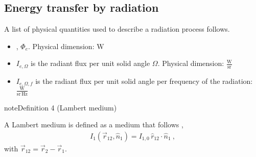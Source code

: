 \documentclass[letterpaper,10pt,english]{jupyterBook}
\begin{document}
\subsection{Energy transfer by radiation}
\label{\detokenize{ch/heat-transfer-radiation:energy-transfer-by-radiation}}
\sphinxAtStartPar
A list of physical quantities used to describe a radiation process follows.
\begin{itemize}
\item {} 
\sphinxAtStartPar
{}, \(\Phi_e\). Physical dimension: \(\text{W}\)

\item {} 
\sphinxAtStartPar
{} \(I_{e, \Omega}\) is the radiant flux per unit solid angle \(\Omega\). Physical dimension: \(\frac{\text{W}}{\text{sr}}\)

\item {} 
\sphinxAtStartPar
{} \(I_{e, \Omega, f}\) is the radiant flux per unit solid angle per frequency of the radiation: \(\frac{\text{W}}{\text{sr} \, \text{Hz}}\)

\end{itemize}
\label{ch/heat-transfer-radiation:definition-0}
\begin{sphinxadmonition}{note}{Definition 4 (Lambert medium)}



\sphinxAtStartPar
A Lambert medium is defined as a medium that follows ,
\begin{equation*}
\begin{split}I_{1}(\vec{r}_{12}, \hat{n}_1) = I_{1,0} \, \hat{r}_{12} \cdot \hat{n}_1 \ ,\end{split}
\end{equation*}
\sphinxAtStartPar
with \(\vec{r}_{12} = \vec{r}_2 - \vec{r}_1\).
\end{sphinxadmonition}
\end{document}
